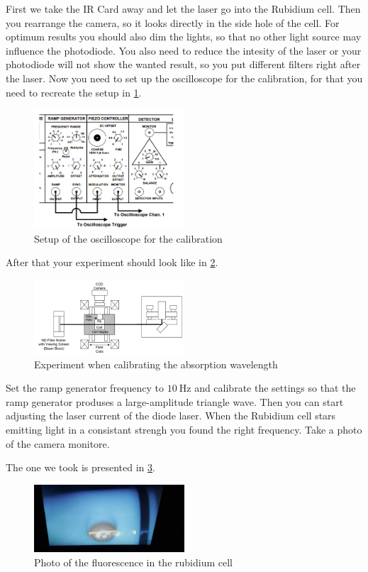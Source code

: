First we take the IR Card away and let the laser go into the Rubidium cell. 
Then you rearrange the camera, so it looks directly in the side hole of the cell. 
For optimum results you should also dim the lights, so that no other light source may influence the photodiode.
You also need to reduce the intesity of the laser or your photodiode will not show the wanted result, so you put different filters right after the laser.
Now you need to set up the oscilloscope for the calibration, for that you need to recreate the setup in \ref{fig:osci1}.
\begin{figure}
    \centering
    \includegraphics[width=0.5\textwidth]{images/generator.png}
    \caption{Setup of the oscilloscope for the calibration \cite{V60}}
    \label{fig:osci1}
\end{figure}
After that your experiment should look like in \ref{fig:part2}.
\begin{figure}
    \centering
    \includegraphics[width=0.5\textwidth]{images/part2.png}
    \caption{Experiment when calibrating the absorption wavelength \cite{V60}}
    \label{fig:part2}
\end{figure}
Set the ramp generator frequency to $\SI{10}{\hertz}$ and calibrate the settings so that the ramp generator produses a large-amplitude triangle wave.
Then you can start adjusting the laser current of the diode laser.
When the Rubidium cell stars emitting light in a consistant strengh you found the right frequency.
Take a photo of the camera monitore.

The one we took is presented in \ref{fig:leucht}.
\begin{figure}
    \centering
    \includegraphics[width=0.5\textwidth]{images/photo_fluorescence.jpg}
    \caption{Photo of the fluorescence in the rubidium cell}
    \label{fig:leucht}
\end{figure}

